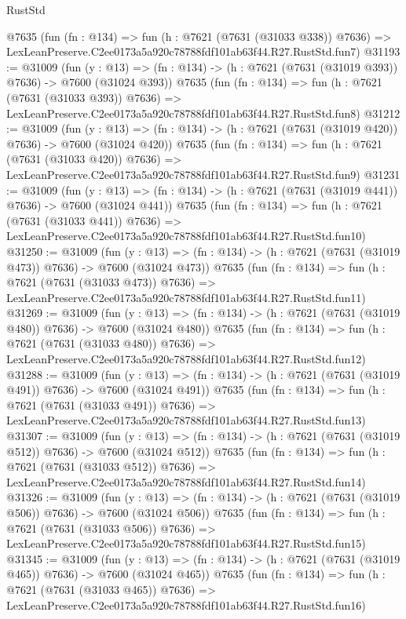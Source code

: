 \begin{lexlean}{RustStd}
\begin{coremodule}
    @7635
    (fun (fn : @134) =>
    fun (h : @7621 (@7631 (@31033 @338)) @7636) =>
    LexLeanPreserve.C2ee0173a5a920c78788fdf101ab63f44.R27.RustStd.fun7)
@31193 := @31009
    (fun (y : @13) => (fn : @134) -> (h : @7621 (@7631 (@31019 @393)) @7636) -> @7600 (@31024 @393))
    @7635
    (fun (fn : @134) =>
    fun (h : @7621 (@7631 (@31033 @393)) @7636) =>
    LexLeanPreserve.C2ee0173a5a920c78788fdf101ab63f44.R27.RustStd.fun8)
@31212 := @31009
    (fun (y : @13) => (fn : @134) -> (h : @7621 (@7631 (@31019 @420)) @7636) -> @7600 (@31024 @420))
    @7635
    (fun (fn : @134) =>
    fun (h : @7621 (@7631 (@31033 @420)) @7636) =>
    LexLeanPreserve.C2ee0173a5a920c78788fdf101ab63f44.R27.RustStd.fun9)
@31231 := @31009
    (fun (y : @13) => (fn : @134) -> (h : @7621 (@7631 (@31019 @441)) @7636) -> @7600 (@31024 @441))
    @7635
    (fun (fn : @134) =>
    fun (h : @7621 (@7631 (@31033 @441)) @7636) =>
    LexLeanPreserve.C2ee0173a5a920c78788fdf101ab63f44.R27.RustStd.fun10)
@31250 := @31009
    (fun (y : @13) => (fn : @134) -> (h : @7621 (@7631 (@31019 @473)) @7636) -> @7600 (@31024 @473))
    @7635
    (fun (fn : @134) =>
    fun (h : @7621 (@7631 (@31033 @473)) @7636) =>
    LexLeanPreserve.C2ee0173a5a920c78788fdf101ab63f44.R27.RustStd.fun11)
@31269 := @31009
    (fun (y : @13) => (fn : @134) -> (h : @7621 (@7631 (@31019 @480)) @7636) -> @7600 (@31024 @480))
    @7635
    (fun (fn : @134) =>
    fun (h : @7621 (@7631 (@31033 @480)) @7636) =>
    LexLeanPreserve.C2ee0173a5a920c78788fdf101ab63f44.R27.RustStd.fun12)
@31288 := @31009
    (fun (y : @13) => (fn : @134) -> (h : @7621 (@7631 (@31019 @491)) @7636) -> @7600 (@31024 @491))
    @7635
    (fun (fn : @134) =>
    fun (h : @7621 (@7631 (@31033 @491)) @7636) =>
    LexLeanPreserve.C2ee0173a5a920c78788fdf101ab63f44.R27.RustStd.fun13)
@31307 := @31009
    (fun (y : @13) => (fn : @134) -> (h : @7621 (@7631 (@31019 @512)) @7636) -> @7600 (@31024 @512))
    @7635
    (fun (fn : @134) =>
    fun (h : @7621 (@7631 (@31033 @512)) @7636) =>
    LexLeanPreserve.C2ee0173a5a920c78788fdf101ab63f44.R27.RustStd.fun14)
@31326 := @31009
    (fun (y : @13) => (fn : @134) -> (h : @7621 (@7631 (@31019 @506)) @7636) -> @7600 (@31024 @506))
    @7635
    (fun (fn : @134) =>
    fun (h : @7621 (@7631 (@31033 @506)) @7636) =>
    LexLeanPreserve.C2ee0173a5a920c78788fdf101ab63f44.R27.RustStd.fun15)
@31345 := @31009
    (fun (y : @13) => (fn : @134) -> (h : @7621 (@7631 (@31019 @465)) @7636) -> @7600 (@31024 @465))
    @7635
    (fun (fn : @134) =>
    fun (h : @7621 (@7631 (@31033 @465)) @7636) =>
    LexLeanPreserve.C2ee0173a5a920c78788fdf101ab63f44.R27.RustStd.fun16)

\end{coremodule}
\end{lexlean}
